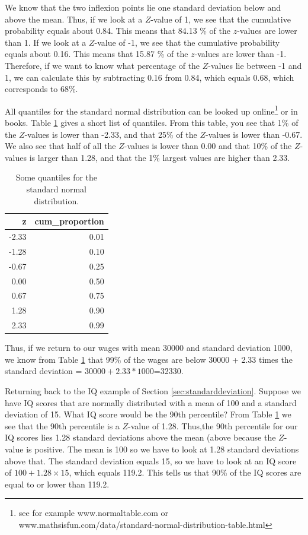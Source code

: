 \documentclass[]{book}\usepackage[]{graphicx}\usepackage[]{color}
\begin{document}
We know that the two inflexion points lie one standard deviation below and above the mean. Thus, if we look at a $Z$-value of 1, we see that the cumulative probability equals about 0.84. This means that 84.13 \% of the $z$-values are lower than 1. If we look at a $Z$-value of -1, we see that the cumulative probability equals about 0.16. This means that 15.87 \% of the $z$-values are lower than -1. Therefore, if we want to know what percentage of the $Z$-values lie between -1 and 1, we can calculate this by subtracting 0.16 from 0.84, which equals 0.68, which corresponds to 68\%.

All quantiles for the standard normal distribution can be looked up online\footnote{see for example www.normaltable.com or www.mathsisfun.com/data/standard-normal-distribution-table.html} or in books. Table \ref{tab:normal_4} gives a short list of quantiles. From this table, you see that 1\% of the $Z$-values is lower than -2.33, and that 25\% of the $Z$-values is lower than -0.67. We also see that half of all the $Z$-values is lower than 0.00 and that 10\% of the $Z$-values is larger than 1.28, and that the 1\% largest values are higher than 2.33.

\begin{table}[ht]
\centering
\caption{Some quantiles for the standard normal distribution.} 
\label{tab:normal_4}
\begin{tabular}{rr}
  \hline
z & cum\_proportion \\ 
  \hline
-2.33 & 0.01 \\ 
  -1.28 & 0.10 \\ 
  -0.67 & 0.25 \\ 
  0.00 & 0.50 \\ 
  0.67 & 0.75 \\ 
  1.28 & 0.90 \\ 
  2.33 & 0.99 \\ 
   \hline
\end{tabular}
\end{table}



Thus, if we return to our wages with mean 30000 and standard deviation 1000, we know from Table \ref{tab:normal_4} that 99\% of the wages are below 30000 + 2.33 times the standard deviation =  $30000+2.33*1000$=32330.

Returning back to the IQ example of Section \ref{sec:standarddeviation}. Suppose we have IQ scores that are normally distributed with a mean of 100 and a standard deviation of 15. What IQ score would be the 90th percentile? From Table \ref{tab:normal_4} we see that the 90th percentile is a $Z$-value of 1.28. Thus,the 90th percentile for our IQ scores lies 1.28 standard deviations above the mean (above because the $Z$-value is positive. The mean is 100 so we have to look at 1.28 standard deviations above that. The standard deviation equals 15, so we have to look at an IQ score of $100 + 1.28 \times 15$, which equals 119.2. This tells us that 90\% of the IQ scores are equal to or lower than 119.2.
\end{document}
